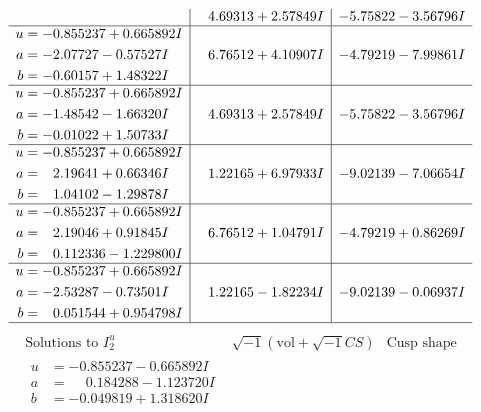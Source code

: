 \documentclass[1p]{elsarticle_modified}
\theoremstyle{definition}
\newcommand{\I}{\sqrt{-1}}
\begin{document}
$$\begin{array}{c|c|c}
 & \phantom{-}4.69313 + 2.57849 I & -5.75822 - 3.56796 I \\ \hline\begin{aligned}
u &= -0.855237 + 0.665892 I \\
a &= -2.07727 - 0.57527 I \\
b &= -0.60157 + 1.48322 I\end{aligned}
 & \phantom{-}6.76512 + 4.10907 I & -4.79219 - 7.99861 I \\ \hline\begin{aligned}
u &= -0.855237 + 0.665892 I \\
a &= -1.48542 - 1.66320 I \\
b &= -0.01022 + 1.50733 I\end{aligned}
 & \phantom{-}4.69313 + 2.57849 I & -5.75822 - 3.56796 I \\ \hline\begin{aligned}
u &= -0.855237 + 0.665892 I \\
a &= \phantom{-}2.19641 + 0.66346 I \\
b &= \phantom{-}1.04102 - 1.29878 I\end{aligned}
 & \phantom{-}1.22165 + 6.97933 I & -9.02139 - 7.06654 I \\ \hline\begin{aligned}
u &= -0.855237 + 0.665892 I \\
a &= \phantom{-}2.19046 + 0.91845 I \\
b &= \phantom{-}0.112336 - 1.229800 I\end{aligned}
 & \phantom{-}6.76512 + 1.04791 I & -4.79219 + 0.86269 I \\ \hline\begin{aligned}
u &= -0.855237 + 0.665892 I \\
a &= -2.53287 - 0.73501 I \\
b &= \phantom{-}0.051544 + 0.954798 I\end{aligned}
 & \phantom{-}1.22165 - 1.82234 I & -9.02139 - 0.06937 I\\
 \hline 
 \end{array}$$\newpage$$\begin{array}{c|c|c}  
\text{Solutions to }I^u_{2}& \I (\text{vol} + \sqrt{-1}CS) & \text{Cusp shape}\\
 \hline 
\begin{aligned}
u &= -0.855237 - 0.665892 I \\
a &= \phantom{-}0.184288 - 1.123720 I \\
b &= -0.049819 + 1.318620 I\end{aligned}

\end{array}$$
\end{document}
